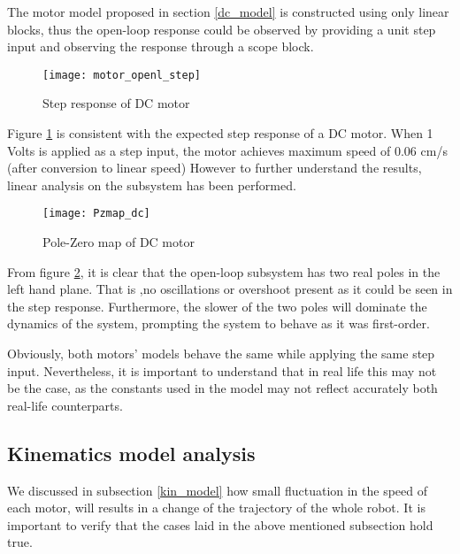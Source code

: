 {The motor model proposed in section \ref{dc_model} is constructed using only linear blocks, thus the open-loop response could be observed by providing a unit step input and observing the response through a scope block. 

\begin{figure}[h]
\centering
\texttt{[image: motor\_openl\_step]}
\caption{Step response of DC motor}
\label{fig::dc_step}
\end{figure} 

Figure \ref{fig::dc_step} is consistent with the expected step response of a DC motor. When 1 Volts is applied as a step input, the motor achieves maximum speed of 0.06 cm/s (after conversion to linear speed) However to further understand the results, linear analysis on the subsystem has been performed.

\begin{figure}[h]
\centering
\texttt{[image: Pzmap\_dc]}
\caption{Pole-Zero map of DC motor}
\label{fig::dc_pz}
\end{figure} 

From figure \ref{fig::dc_pz}, it is clear that the open-loop subsystem has two real poles in the left hand plane. That is ,no oscillations or overshoot present as it could be seen in the step response. Furthermore, the slower of the two poles will dominate the dynamics of the system, prompting the system to behave as it was first-order. 

Obviously, both motors' models behave the same while applying the same step input. Nevertheless, it is important to understand that in real life this may not be the case, as the constants used in the model may not reflect accurately both real-life counterparts.

\subsection{Kinematics model analysis} \label{kin_analysis}

We discussed in subsection \ref{kin_model} how small fluctuation in the speed of each motor, will results in a change of the trajectory of the whole robot. It is important to verify that the cases laid in the above mentioned subsection hold true.

}
